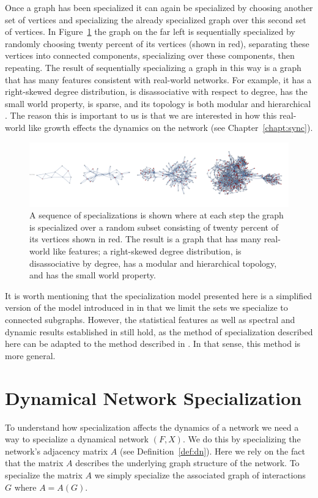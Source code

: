 \documentclass[12pt]{thesis}
\begin{document}
Once a graph has been specialized it can again be specialized by choosing another set of vertices and specializing the already specialized graph over this second set of vertices.
In Figure~\ref{fig:trafficexample001} the graph on the far left is sequentially specialized by randomly choosing twenty percent of its vertices (shown in red), separating these vertices into connected components, specializing over these components, then repeating.
The result of sequentially specializing a graph in this way is a graph that has many features consistent with real-world networks.
For example, it has a right-skewed degree distribution, is disassociative with respect to degree, has the small world property, is sparse, and its topology is both modular and hierarchical \cite{8}.
The reason this is important to us is that we are interested in how this real-world like growth effects the {dynamics on} the network (see Chapter~\ref{chapt:sync}).

\begin{figure}
    \centering
    \includegraphics[scale=0.21]{images/synchspecexample.pdf}
    \caption{A sequence of specializations is shown where at each step the graph is specialized over a random subset consisting of twenty percent of its vertices shown in red. The result is a graph that has many real-world like features; a right-skewed degree distribution, is disassociative by degree, has a modular and hierarchical topology, and has the {small world property}.}
    \label{fig:trafficexample001}
\end{figure}

It is worth mentioning that the specialization model presented here is a simplified version of the model introduced in \cite{8} in that we limit the sets we specialize to connected subgraphs.
However, the statistical features as well as spectral and dynamic results established in \cite{8,Bunimovich20} still hold, as the method of specialization described here can be adapted to the method
described in \cite{8,Bunimovich20}.
In that sense, this method is more general.

\section{Dynamical Network Specialization}
To understand how specialization affects the dynamics of a network we need a way to specialize a dynamical network $(F,X)$. We do this by specializing the network's adjacency matrix $A$ (see Definition~\ref{def:dn}).
Here we rely on the fact that the matrix $A$ describes the underlying graph structure of the network.
To specialize the matrix $A$ we simply specialize the associated graph of interactions $G$ where $A=A(G)$.
\end{document}
